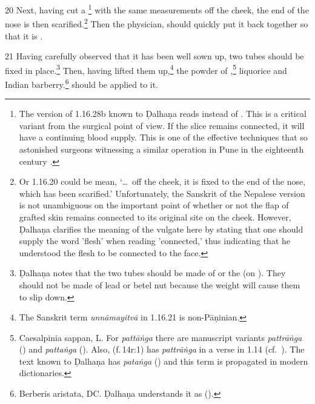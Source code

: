 \begin{translation}
    \item[20] Next, having cut a \footnote{The
    version of 1.16.28b known to Ḍalhaṇa \citep[81]{vulgate} reads  instead of .
    This is a critical variant from the surgical point of view.  If the slice remains
    connected, it will have a continuing blood supply.  This is one of the effective 
    techniques that so astonished surgeons witnessing a similar operation in Pune in
    the eighteenth century \citep[see][67--70]{wuja-2003}.} with the same
    measurements off the cheek, the end of the nose is then scarified.\footnote{Or 1.16.20 could be mean, 
    `\ldots\ off the cheek, it is fixed to the end of the nose, which has been
    scarified.' Unfortunately, the Sanskrit of the Nepalese version is not unambiguous on the
    important point of whether or not the flap of grafted skin remains connected
    to its original site on the cheek. However, Ḍalhaṇa \citep[81]{vulgate} clarifies the meaning of the vulgate here by stating that one should supply the word 'flesh' when reading 'connected,' thus indicating that he understood the flesh to be connected to the face.} %
%
Then the  physician, 
    should quickly put it back together so that it is 
    .
    
    \item[21] 
    Having carefully observed that it has been well sown up,
    two tubes should be fixed in place.\footnote{Ḍalhaṇa notes that the two tubes 
    should be made of  or the  (on ). They should not be made of 
    lead or betel nut because the weight will cause them to slip down.} Then, 
    having lifted them up,\footnote{The 
    Sanskrit term \emph{unnāmayitvā} in 1.16.21 is non-Pāṇinian.}
    the powder of ,\footnote{Caesalpinia sappan, L. 
    For \emph{pattāṅga} there are manuscript variants 
    \emph{pattrāṅga} () and \emph{pattaṅga} 
    ().  Also,  
    (f.\,14r:1) has \emph{pattrāṅga} in a verse in 1.14 (cf.\ ). The 
    text known to Ḍalhaṇa  has \emph{pataṅga} () and this term 
    is propagated in modern dictionaries.}
    {liquorice}
    and
    Indian barberry.\footnote{Berberis aristata, DC.
Ḍalhaṇa understands it as  (\cite[81]{vulgate}).}
    should be applied to it.
    

\end{translation}
